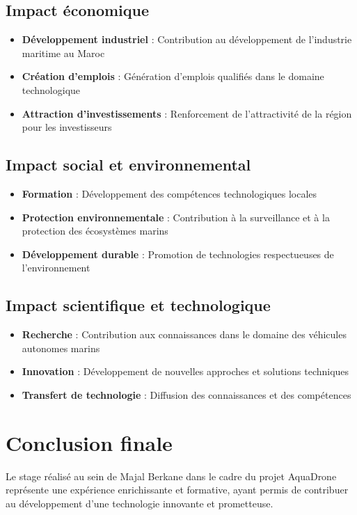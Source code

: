 {\subsection{Impact économique}
\begin{itemize}
    \item \textbf{Développement industriel} : Contribution au développement de l'industrie maritime au Maroc
    \item \textbf{Création d'emplois} : Génération d'emplois qualifiés dans le domaine technologique
    \item \textbf{Attraction d'investissements} : Renforcement de l'attractivité de la région pour les investisseurs
\end{itemize}

\subsection{Impact social et environnemental}
\begin{itemize}
    \item \textbf{Formation} : Développement des compétences technologiques locales
    \item \textbf{Protection environnementale} : Contribution à la surveillance et à la protection des écosystèmes marins
    \item \textbf{Développement durable} : Promotion de technologies respectueuses de l'environnement
\end{itemize}

\subsection{Impact scientifique et technologique}
\begin{itemize}
    \item \textbf{Recherche} : Contribution aux connaissances dans le domaine des véhicules autonomes marins
    \item \textbf{Innovation} : Développement de nouvelles approches et solutions techniques
    \item \textbf{Transfert de technologie} : Diffusion des connaissances et des compétences
\end{itemize}

\section{Conclusion finale}
Le stage réalisé au sein de Majal Berkane dans le cadre du projet AquaDrone représente une expérience enrichissante et formative, ayant permis de contribuer au développement d'une technologie innovante et prometteuse.

}
